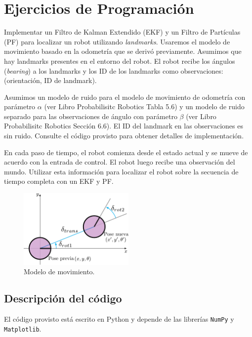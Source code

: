 \documentclass[tp]{lcc}
\begin{document}
	
	\section{Ejercicios de Programación}
		
	Implementar un Filtro de Kalman Extendido (EKF) y un Filtro de Partículas (PF) para localizar un robot utilizando \emph{landmarks}. Usaremos el modelo de movimiento basado en la odometría que se derivó previamente. Asumimos que hay landmarks presentes en el entorno del robot. El robot recibe los ángulos (\emph{bearing}) a los landmarks y los ID de los landmarks como observaciones: (orientación, ID de landmark).
	
	Asumimos un modelo de ruido para el modelo de movimiento de odometría con parámetro $\alpha$ (ver Libro Probabilisitc Robotics Tabla 5.6) y un modelo de ruido separado para las observaciones de ángulo con parámetro $\beta$ (ver Libro Probabilisitc Robotics Sección 6.6). El ID del landmark en las observaciones es sin ruido. Consulte el código provisto para obtener detalles de implementación.
	
	En cada paso de tiempo, el robot comienza desde el estado actual y se mueve de acuerdo con la entrada de control. El robot luego recibe una observación del mundo. Utilizar esta información para localizar el robot sobre la secuencia de tiempo completa con un EKF y PF.
	
	\begin{figure}[!htbp]
		\centering
		\includegraphics[width=0.5\textwidth]{./images/odometry_as_controls.pdf}
        \caption{Modelo de movimiento.}
		\label{fig:odometry-base-motion-model}
	\end{figure}

	\subsection{Descripción del código}
	
	El código provisto está escrito en Python y depende de las librerías \lstinline[style=bash]{NumPy} y \lstinline[style=bash]{Matplotlib}.
	
\end{document}
